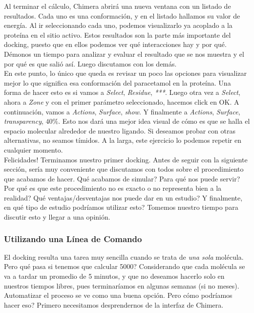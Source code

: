 \documentclass[10pt,letterpaper]{article}
\begin{document}
Al terminar el c\'alculo, Chimera abrir\'a una nueva ventana con un listado de resultados. Cada uno es una conformaci\'on, y en el listado hallamos su valor de energ\'ia. Al ir seleccionando cada uno, podemos visualizarlo ya acoplado a la prote\'ina en el sitio activo. Estos resultados son la parte m\'as importante del docking, puesto que en ellos podemos ver qu\'e interacciones hay y por qu\'e. D\'emonos un tiempo para analizar y evaluar el resultado que se nos muestra y el por qu\'e es que sali\'o as\'i. Luego discutamos con los dem\'as.\\

En este punto, lo \'unico que queda es revisar un poco las opciones para visualizar mejor lo que significa esa conformaci\'on del paracetamol en la prote\'ina. Una forma de hacer esto es si vamos a \emph{Select}, \emph{Residue}, \emph{***}. Luego otra vez a \emph{Select}, ahora a \emph{Zone} y con el primer par\'ametro seleccionado, hacemos click en OK. A continuaci\'on, vamos a \emph{Actions}, \emph{Surface}, \emph{show}. Y finalmente a \emph{Actions}, \emph{Surface}, \emph{transparency}, $40\%$. Esto nos dar\'a una mejor idea visual de c\'omo es que se halla el espacio molecular alrededor de nuestro ligando. Si deseamos probar con otras alternativas, no seamos t\'imidos. A la larga, este ejercicio lo podemos repetir en cualquier momento.\\

Felicidades! Terminamos nuestro primer docking. Antes de seguir con la siguiente secci\'on, ser\'ia muy conveniente que discutamos con todos sobre el procedimiento que acabamos de hacer. Qu\'e acabamos de simular? Para qu\'e nos puede servir? Por qu\'e es que este procedimiento no es exacto o no representa bien a la realidad? Qu\'e ventajas/desventajas nos puede dar en un estudio? Y finalmente, en qu\'e tipo de estudio podr\'iamos utilizar esto? Tomemos nuestro tiempo para discutir esto y llegar a una opini\'on.

\subsubsection{Utilizando una L\'inea de Comando}
El docking resulta una tarea muy sencilla cuando se trata de \emph{una sola} mol\'ecula. Pero qu\'e pasa si tenemos que calcular 5000? Considerando que cada mol\'ecula se va a tardar un promedio de 5 minutos, y que no deseamos hacerlo solo en nuestros tiempos libres, pues terminar\'iamos en algunas semanas (si no meses). Automatizar el proceso se ve como una buena opci\'on. Pero c\'omo podr\'iamos hacer eso? Primero necesitamos desprendernos de la interfaz de Chimera.\\
\end{document}
